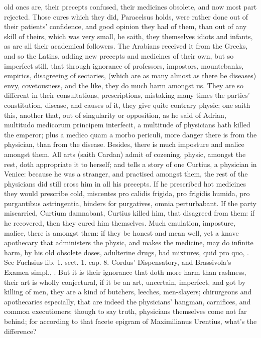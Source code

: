 {old ones are, their precepts confused, their medicines obsolete, and
now most part rejected. Those cures which they did, Paracelsus holds,
were rather done out of their patients' confidence, and good
opinion they had of them, than out of any skill of theirs, which was
very small, he saith, they themselves idiots and infants, as are all
their academical followers. The Arabians received it from the Greeks,
and so the Latins, adding new precepts and medicines of their own, but
so imperfect still, that through ignorance of professors, impostors,
mountebanks, empirics, disagreeing of sectaries, (which are as many
almost as there be diseases) envy, covetousness, and the like, they do
much harm amongst us. They are so different in their consultations,
prescriptions, mistaking many times the parties' constitution,
disease, and causes of it, they give quite contrary physic;
one saith this, another that, out of singularity or opposition,
as he said of Adrian, multitudo medicorum principem interfecit, a
multitude of physicians hath killed the emperor; plus a medico quam a
morbo periculi, more danger there is from the physician, than from the
disease. Besides, there is much imposture and malice amongst them. All
arts (saith Cardan) admit of cozening, physic, amongst the rest,
doth appropriate it to herself; and tells a story of one Curtius, a
physician in Venice: because he was a stranger, and practised amongst
them, the rest of the physicians did still cross him in all his
precepts. If he prescribed hot medicines they would prescribe cold,
miscentes pro calidis frigida, pro frigidis humida, pro purgantibus
astringentia, binders for purgatives, omnia perturbabant. If the party
miscarried, Curtium damnabant, Curtius killed him, that disagreed from
them: if he recovered, then they cured him themselves. Much
emulation, imposture, malice, there is amongst them: if they be honest
and mean well, yet a knave apothecary that administers the physic, and
makes the medicine, may do infinite harm, by his old obsolete doses,
adulterine drugs, bad mixtures, quid pro quo, \etc{}. See Fuchsius lib. 1.
sect. 1. cap. 8. Cordus' Dispensatory, and Brassivola's Examen simpl.,
\etc{}. But it is their ignorance that doth more harm than rashness, their
art is wholly conjectural, if it be an art, uncertain, imperfect, and
got by killing of men, they are a kind of butchers, leeches,
men-slayers; chirurgeons and apothecaries especially, that are indeed
the physicians' hangman, carnifices, and common executioners; though to
say truth, physicians themselves come not far behind; for according to
that facete epigram of Maximilianus Urentius, what's the difference?

}
